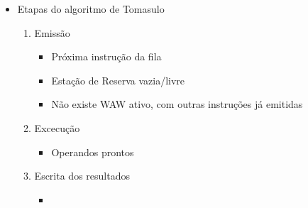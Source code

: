 \documentclass[12pt]{article}
\begin{document}
\begin{itemize}
\begin{itemize}
            A estação de reserva só tem espaço para uma instrução

            \item Etapas do algoritmo de Tomasulo
            \begin{enumerate}
                \item Emissão
                \begin{itemize}
                    \item Próxima instrução da fila
                    \item Estação de Reserva vazia/livre
                    \item Não existe WAW ativo, com outras instruções já emitidas
                \end{itemize}
                \item Excecução
                \begin{itemize}
                    \item Operandos prontos
                \end{itemize}
                \item Escrita dos resultados
                \begin{itemize}
                    \item 
                \end{itemize}
            \end{enumerate}
        \end{itemize}
    \end{itemize}
\end{document}
